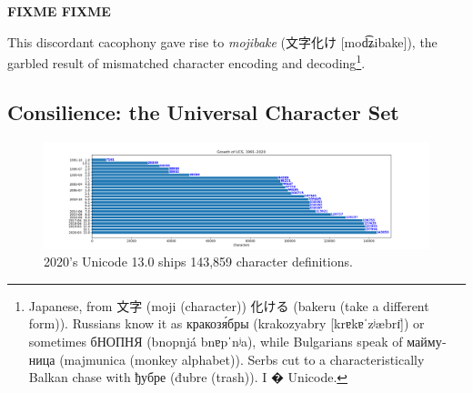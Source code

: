 \documentclass[letterpaper,10pt]{article}
\begin{document}
\textbf{FIXME FIXME}

This discordant cacophony gave rise to \textit{mojibake} (文字化け [{mod͡ʑibake}]),
the garbled result of mismatched character encoding and decoding\footnote{Japanese, from 文字 (moji (character))
化ける (bakeru (take a different form)). Russians know it as \textrussian{кракозя́бры}
(krakozyabry [{krɐkɐˈzʲæbrɪ̈}]) or sometimes
\textrussian{бНОПНЯ} (bnopnjá {bnɐpˈnʲa}), while
Bulgarians speak of \textbulgarian{маймуница} (majmunica (monkey alphabet)).
Serbs cut to a characteristically Balkan chase with \textrussian{ђубре} (đubre
(trash)). I {�} Unicode.}.

\subsection{Consilience: the Universal Character Set}
\label{sec:ucs}
\begin{figure}[!htb]
  \centering
  \includegraphics[width=1.1\linewidth]{media/unicode-growth.png}
  \caption{2020's Unicode 13.0 ships 143,859 character definitions.}
  \label{fig:unicodegrowth}
\end{figure}
\end{document}
